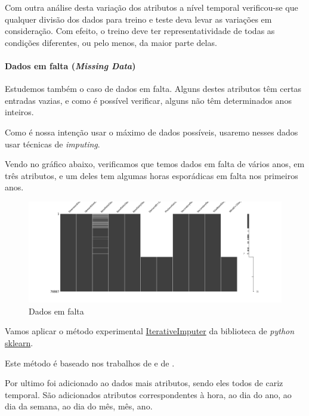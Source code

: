 Com outra análise desta variação dos atributos a nível temporal verificou-se que qualquer divisão dos dados para treino e teste deva levar as variações em consideração. Com efeito, o treino deve ter representatividade de todas as condições diferentes, ou pelo menos, da maior parte delas.\par


\paragraph{Dados em falta (\textit{Missing Data})}
\text{ }  \par

Estudemos também o caso de dados em falta. Alguns destes atributos têm certas entradas vazias, e como é possível verificar, alguns não têm determinados anos inteiros.\par
Como é nossa intenção usar o máximo de dados possíveis, usaremo nesses dados usar técnicas de \textit{imputing}.\par
Vendo no gráfico abaixo, verificamos que temos dados em falta de vários anos, em três atributos, e um deles tem algumas horas esporádicas em falta nos primeiros anos.\par

\begin{figure}[H]
  \centering
  \includegraphics[width=\textwidth]{plots/missing_data.png}
  \caption{Dados em falta}
\end{figure}

Vamos aplicar o método experimental \href{https://scikit-learn.org/stable/modules/generated/sklearn.impute.IterativeImputer.html}{IterativeImputer} da biblioteca de \textit{python} \href{https://scikit-learn.org/stable/index.html}{sklearn}.\par
Este método é baseado nos trabalhos de \cite{vanBuuren2011} e de \cite{Buck1960}.\par
Por ultimo foi adicionado ao dados mais atributos, sendo eles todos de cariz temporal. São adicionados atributos correspondentes à hora, ao dia do ano, ao dia da semana, ao dia do mês, mês, ano.\par

